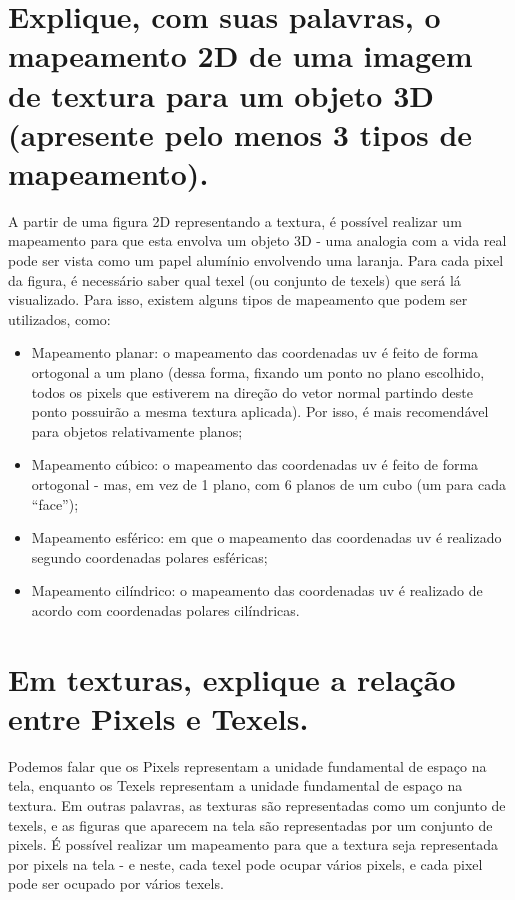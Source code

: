 \documentclass{article}
\begin{document}
\section{Explique, com suas palavras, o mapeamento 2D de uma imagem de textura para um objeto 3D (apresente pelo menos 3 tipos de mapeamento).}

A partir de uma figura 2D representando a textura, é possível realizar um mapeamento para que esta envolva um objeto 3D - uma analogia com a vida real pode ser vista como um papel alumínio envolvendo uma laranja. Para cada pixel da figura, é necessário saber qual texel (ou conjunto de texels) que será lá visualizado. Para isso, existem alguns tipos de mapeamento que podem ser utilizados, como:

\begin{itemize}[noitemsep]
\item Mapeamento planar: o mapeamento das coordenadas uv é feito de forma ortogonal a um plano (dessa forma, fixando um ponto no plano escolhido, todos os pixels que estiverem na direção do vetor normal partindo deste ponto possuirão a mesma textura aplicada). Por isso, é mais recomendável para objetos relativamente planos;
\item Mapeamento cúbico: o mapeamento das coordenadas uv é feito de forma ortogonal - mas, em vez de 1 plano, com 6 planos de um cubo (um para cada ``face'');
\item Mapeamento esférico: em que o mapeamento das coordenadas uv é realizado segundo coordenadas polares esféricas;
\item Mapeamento cilíndrico: o mapeamento das coordenadas uv é realizado de acordo com coordenadas polares cilíndricas.
\end{itemize}

\section{Em texturas, explique a relação entre Pixels e Texels.}

Podemos falar que os Pixels representam a unidade fundamental de espaço na tela, enquanto os Texels representam a unidade fundamental de espaço na textura. Em outras palavras, as texturas são representadas como um conjunto de texels, e as figuras que aparecem na tela são representadas por um conjunto de pixels. É possível realizar um mapeamento para que a textura seja representada por pixels na tela - e neste, cada texel pode ocupar vários pixels, e cada pixel pode ser ocupado por vários texels.
\end{document}

